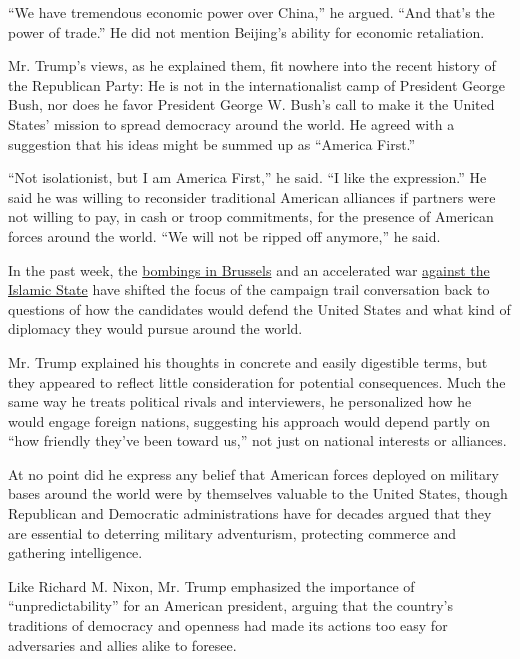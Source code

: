 ``We have tremendous economic power over China,'' he argued. ``And
that's the power of trade.'' He did not mention Beijing's ability for
economic retaliation.

Mr. Trump's views, as he explained them, fit nowhere into the recent
history of the Republican Party: He is not in the internationalist camp
of President George Bush, nor does he favor President George W. Bush's
call to make it the United States' mission to spread democracy around
the world. He agreed with a suggestion that his ideas might be summed up
as ``America First.''

``Not isolationist, but I am America First,'' he said. ``I like the
expression.'' He said he was willing to reconsider traditional American
alliances if partners were not willing to pay, in cash or troop
commitments, for the presence of American forces around the world. ``We
will not be ripped off anymore,'' he said.

In the past week, the
\href{http://www.nytimes.com/2016/03/23/world/europe/brussels-airport-explosions.html}{bombings
in Brussels} and an accelerated war
\href{http://www.nytimes.com/2016/03/26/world/middleeast/abd-al-rahman-mustafa-al-qaduli-isis-reported-killed-in-syria.html}{against
the Islamic State} have shifted the focus of the campaign trail
conversation back to questions of how the candidates would defend the
United States and what kind of diplomacy they would pursue around the
world.

Mr. Trump explained his thoughts in concrete and easily digestible
terms, but they appeared to reflect little consideration for potential
consequences. Much the same way he treats political rivals and
interviewers, he personalized how he would engage foreign nations,
suggesting his approach would depend partly on ``how friendly they've
been toward us,'' not just on national interests or alliances.

At no point did he express any belief that American forces deployed on
military bases around the world were by themselves valuable to the
United States, though Republican and Democratic administrations have for
decades argued that they are essential to deterring military
adventurism, protecting commerce and gathering intelligence.

Like Richard M. Nixon, Mr. Trump emphasized the importance of
``unpredictability'' for an American president, arguing that the
country's traditions of democracy and openness had made its actions too
easy for adversaries and allies alike to foresee.

